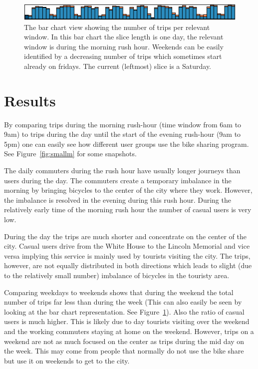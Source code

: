 \begin{figure}[h]
\centering
\includegraphics[width=\linewidth]{images/barchart.png}
\caption{The bar chart view showing the number of trips per relevant
window.
In this bar chart the slice length is one day, the relevant window is
during the morning rush hour.
Weekends can be easily identified by a decreasing number of trips
which sometimes start already on fridays.
The current (leftmost) slice is a Saturday.}
\label{fig:bar}
\end{figure}

\section{Results}
\label{sec:result}
By comparing trips during the morning rush-hour (time window from
6am to 9am) to trips during the day until the start of
the evening rush-hour (9am to 5pm) one can easily see
how different user groups use the bike sharing program.
See Figure~\ref{fig:smallm} for some snapshots.

The daily commuters during the rush hour have usually longer
journeys than users during the day. The commuters create
a temporary imbalance in the morning by bringing bicycles
to the center of the city where they work. However, the imbalance is
resolved in the evening during this rush hour. During the relatively
early time of the morning rush hour the number of casual users
is very low.

During the day the trips are much shorter and concentrate on the
center of the city. Casual users drive from the White House to
the Lincoln Memorial and vice versa implying this service is mainly
used by tourists visiting the city. The trips, however, are not
equally distributed in both directions which leads to slight (due to
the relatively small number) imbalance of bicycles in the touristy
area.

Comparing weekdays to weekends shows that during the weekend
the total number of trips far less than during the week (This can also
easily be seen by looking at the bar chart representation. See Figure~\ref{fig:bar}).
Also the ratio of casual users is much higher.
This is likely due to day tourists visiting over the weekend
and the working commuters staying at home on the weekend.
However, trips on a weekend are not as much focused on the center
as trips during the mid day on the week.
This may come from
people that normally do not use the bike share but use it on
weekends to get to the city.

